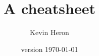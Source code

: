 \documentclass[a4paper,landscape,columns=3]{cheatsheet}
\title{A cheatsheet}
\author{Kevin Heron}
\date{version \today}
\begin{document}
\maketitle

\lipsum

% 
\end{document}
